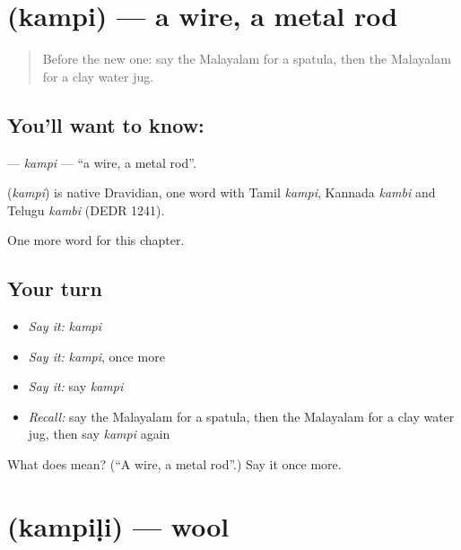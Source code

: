 \section[\texorpdfstring{\ml{കമ്പി} (kampi)}{കമ്പി (kampi)}]{ (kampi) — a wire, a metal rod}

\label{lesson:ML-C331-kampi}



\begin{quote}
Before the new one: say the Malayalam for a spatula, then the Malayalam for a clay water jug.
\end{quote}

\subsection*{You'll want to know: }
\textbf{} — \emph{kampi} — \textquotedblleft{}a wire, a metal rod\textquotedblright{}.

\begin{cousinweb}
\textbf{} (\emph{kampi}) is native Dravidian, one word with Tamil \emph{kampi}, Kannada \emph{kambi} and Telugu \emph{kambi} (DEDR 1241).
\end{cousinweb}

\begin{grammarlens}[title={What you've built}]
One more word for this chapter.
\end{grammarlens}

\subsection*{Your turn}
\begin{itemize}
\raggedright
  \item \emph{Say it:} \emph{kampi}
  \item \emph{Say it:} \emph{kampi}, once more
  \item \emph{Say it:} say \emph{kampi}
  \item \emph{Recall:} say the Malayalam for a spatula, then the Malayalam for a clay water jug, then say \emph{kampi} again
\end{itemize}

\begin{tcolorbox}[breakable,colback=teal!4,colframe=teal!35!black,title={Before you move on}]
What does  mean? (\textquotedblleft{}A wire, a metal rod\textquotedblright{}.) Say it once more.
\end{tcolorbox}
\section[\texorpdfstring{\ml{കമ്പിളി} (kampiḷi)}{കമ്പിളി (kampiḷi)}]{ (kampiḷi) — wool}

